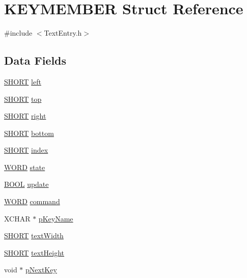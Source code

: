 \hypertarget{struct_k_e_y_m_e_m_b_e_r}{}\section{K\+E\+Y\+M\+E\+M\+B\+E\+R Struct Reference}
\label{struct_k_e_y_m_e_m_b_e_r}


{\ttfamily \#include $<$Text\+Entry.\+h$>$}

\subsection*{Data Fields}
\begin{DoxyCompactItemize}
\item 
\hyperlink{_generic_type_defs_8h_ae9bb25d3afecf3bfab0fbe3c22c2050f}{S\+H\+O\+R\+T} \hyperlink{struct_k_e_y_m_e_m_b_e_r_a24b9199fd8600849a2a3f9933474789d}{left}
\item 
\hyperlink{_generic_type_defs_8h_ae9bb25d3afecf3bfab0fbe3c22c2050f}{S\+H\+O\+R\+T} \hyperlink{struct_k_e_y_m_e_m_b_e_r_ae53b6204fda5d3270bd1a3aba7a88eab}{top}
\item 
\hyperlink{_generic_type_defs_8h_ae9bb25d3afecf3bfab0fbe3c22c2050f}{S\+H\+O\+R\+T} \hyperlink{struct_k_e_y_m_e_m_b_e_r_aa414475e19c55ba5db1b1f485f5e3785}{right}
\item 
\hyperlink{_generic_type_defs_8h_ae9bb25d3afecf3bfab0fbe3c22c2050f}{S\+H\+O\+R\+T} \hyperlink{struct_k_e_y_m_e_m_b_e_r_a85afe4f0d49adc47a2c4e5e7bf20f219}{bottom}
\item 
\hyperlink{_generic_type_defs_8h_ae9bb25d3afecf3bfab0fbe3c22c2050f}{S\+H\+O\+R\+T} \hyperlink{struct_k_e_y_m_e_m_b_e_r_a38410e84c6bf7150043d7e743f41750d}{index}
\item 
\hyperlink{_generic_type_defs_8h_a2b0e863dadf920709ec53d9088ee7c91}{W\+O\+R\+D} \hyperlink{struct_k_e_y_m_e_m_b_e_r_a5d717a64978f34c9afb8ae23374160a0}{state}
\item 
\hyperlink{_generic_type_defs_8h_a54d65c7fa62e62c9754371e42f5111b9}{B\+O\+O\+L} \hyperlink{struct_k_e_y_m_e_m_b_e_r_ae0027ff2f19db0b2b4959a23b34ff53f}{update}
\item 
\hyperlink{_generic_type_defs_8h_a2b0e863dadf920709ec53d9088ee7c91}{W\+O\+R\+D} \hyperlink{struct_k_e_y_m_e_m_b_e_r_ade7c4147b4fe3608e0082cc4c1b92356}{command}
\item 
X\+C\+H\+A\+R $\ast$ \hyperlink{struct_k_e_y_m_e_m_b_e_r_a57105db8fa0e820d6255178441ef7dd2}{p\+Key\+Name}
\item 
\hyperlink{_generic_type_defs_8h_ae9bb25d3afecf3bfab0fbe3c22c2050f}{S\+H\+O\+R\+T} \hyperlink{struct_k_e_y_m_e_m_b_e_r_a9fbde8f74d930599fd9206a263e46cd6}{text\+Width}
\item 
\hyperlink{_generic_type_defs_8h_ae9bb25d3afecf3bfab0fbe3c22c2050f}{S\+H\+O\+R\+T} \hyperlink{struct_k_e_y_m_e_m_b_e_r_a40fa9c35391b0005032180b85e7afd34}{text\+Height}
\item 
void $\ast$ \hyperlink{struct_k_e_y_m_e_m_b_e_r_a85401413b32441191ae69404967d9f29}{p\+Next\+Key}
\end{DoxyCompactItemize}


